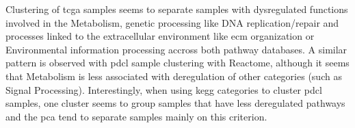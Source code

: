 Clustering of \acrshort{tcga} samples seems to separate samples with dysregulated functions involved in the Metabolism, genetic processing like DNA replication/repair and processes linked to the extracellular environment like \acrshort{ecm} organization or Environmental information processing accross both pathway databases.
A similar pattern is observed with \acrshort{pdcl} sample clustering with Reactome, although it seems that Metabolism is less associated with deregulation of other categories (such as Signal Processing).
Interestingly, when using \acrshort{kegg} categories to cluster \acrshort{pdcl} samples, one cluster seems to group samples that have less deregulated pathways and the \acrshort{pca} tend to separate samples mainly on this criterion.